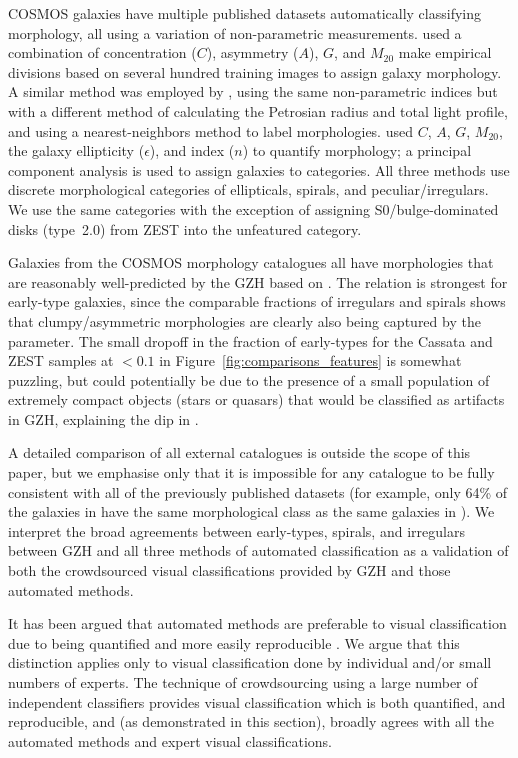 \documentclass[a4paper,fleqn,usenatbib]{mnras}
\begin{document}
COSMOS galaxies have multiple published datasets automatically classifying
morphology, all using a variation of non-parametric measurements. \citet{cas07}
used a combination of concentration ($C$), asymmetry ($A$), $G$, and $M_{20}$
\citep{cas05} make empirical divisions based on several hundred training images
to assign galaxy morphology. A similar method was employed by \citet{tas11},
using the same non-parametric indices but with a different method of
calculating the Petrosian radius and total light profile, and using a
nearest-neighbors method to label morphologies. \citet[][ZEST]{sca07} used $C$,
$A$, $G$, $M_{20}$, the galaxy ellipticity ($\epsilon$), and \sersic{} index
($n$) to quantify morphology; a principal component analysis is used to assign
galaxies to categories. All three methods use discrete morphological categories
of ellipticals, spirals, and peculiar/irregulars. We use the same categories
with the exception of assigning S0/bulge-dominated disks (type~2.0) from ZEST
into the unfeatured category.

Galaxies from the COSMOS morphology catalogues all have morphologies that are
reasonably well-predicted by the GZH based on \fbest. The relation is strongest
for early-type galaxies, since the comparable fractions of irregulars and
spirals shows that clumpy/asymmetric morphologies are clearly also being
captured by the \fbest{} parameter. The small dropoff in the fraction of
early-types for the Cassata and ZEST samples at \fbest$<0.1$ in
Figure~\ref{fig:comparisons_features} is somewhat puzzling, but could
potentially be due to the presence of a small population of extremely
compact objects (stars or quasars) that would be classified as artifacts in
GZH, explaining the dip in \fbest.

A detailed comparison of all external catalogues is outside the scope of this
paper, but we emphasise only that it is impossible for any catalogue to be fully
consistent with all of the previously published datasets (for example, only
64\% of the galaxies in \citealt{tas11} have the same morphological class as
the same galaxies in \citealt{cas07}). We interpret the broad agreements
between early-types, spirals, and irregulars between GZH and all three methods
of automated classification as a validation of both the crowdsourced visual
classifications provided by GZH and those automated methods.

It has been argued that automated methods are preferable to visual
classification due to being quantified and more easily reproducible
\citep[\eg,][]{con14,paw16}. We argue that this distinction applies only to
visual classification done by individual and/or small numbers of experts. The
technique of crowdsourcing using a large number of independent classifiers
provides visual classification which is both quantified, and reproducible, and
(as demonstrated in this section), broadly agrees with all the automated
methods and expert visual classifications.
\end{document}
